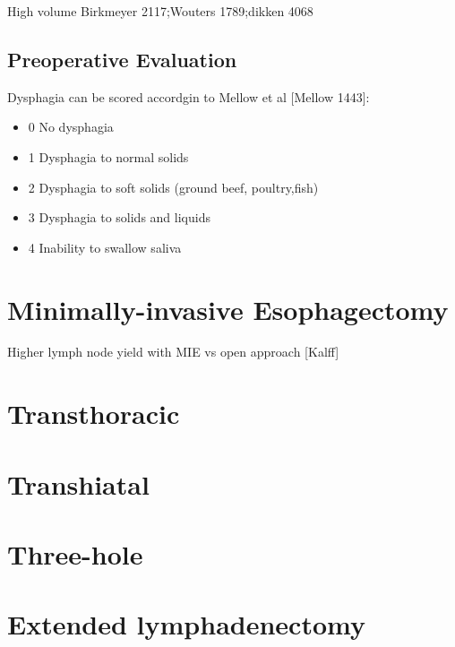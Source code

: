 \documentclass[
]{book}
\providecommand{\tightlist}{%
  \setlength{\itemsep}{0pt}\setlength{\parskip}{0pt}}
\begin{document}
High volume Birkmeyer 2117;Wouters 1789;dikken 4068

\hypertarget{preoperative-evaluation}{%
\subsection{Preoperative Evaluation}\label{preoperative-evaluation}}

Dysphagia can be scored accordgin to Mellow et al {[}Mellow 1443{]}:

\begin{itemize}
\tightlist
\item
  0 No dysphagia
\item
  1 Dysphagia to normal solids
\item
  2 Dysphagia to soft solids (ground beef, poultry,fish)
\item
  3 Dysphagia to solids and liquids
\item
  4 Inability to swallow saliva
\end{itemize}

\hypertarget{minimally-invasive-esophagectomy-2}{%
\section{Minimally-invasive Esophagectomy}\label{minimally-invasive-esophagectomy-2}}

Higher lymph node yield with MIE vs open approach {[}Kalff{]}

\hypertarget{transthoracic-1}{%
\section{Transthoracic}\label{transthoracic-1}}

\hypertarget{transhiatal-1}{%
\section{Transhiatal}\label{transhiatal-1}}

\hypertarget{three-hole-1}{%
\section{Three-hole}\label{three-hole-1}}

\hypertarget{extended-lymphadenectomy-1}{%
\section{Extended lymphadenectomy}\label{extended-lymphadenectomy-1}}
\end{document}
